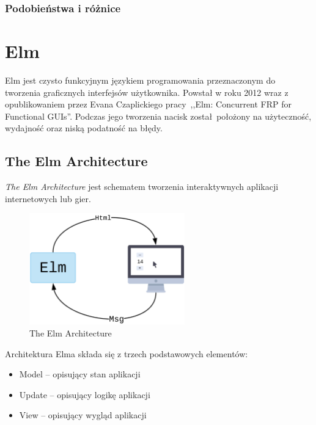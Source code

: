 \documentclass[twoside,a4paper]{report}
\begin{document}
\subsection{Podobieństwa i różnice}


\chapter{Elm}
Elm\cite{elmdocs} jest czysto funkcyjnym językiem programowania przeznaczonym do tworzenia graficznych interfejsów użytkownika.
Powstał w roku 2012 wraz z opublikowaniem przez Evana Czaplickiego pracy~,,Elm: Concurrent FRP for Functional GUIs''\cite{Czaplicki2012ElmC}.
Podczas jego tworzenia nacisk został położony na użyteczność, wydajność oraz niską podatność na błędy.

\section{The Elm Architecture}
\textit{The Elm Architecture} jest schematem tworzenia interaktywnych aplikacji internetowych lub gier.
\begin{figure}[h]
    \centering
    \includegraphics[width=0.6\textwidth]{elm_arch.png}
    \caption{The Elm Architecture}\label{fig:elm_arch}
\end{figure}

Architektura Elma składa się z trzech podstawowych elementów:
\begin{itemize}
    \setlength\itemsep{-0.1em}
    \item Model -- opisujący stan aplikacji
    \item Update -- opisujący logikę aplikacji
    \item View -- opisujący wygląd aplikacji
\end{itemize}
\end{document}
